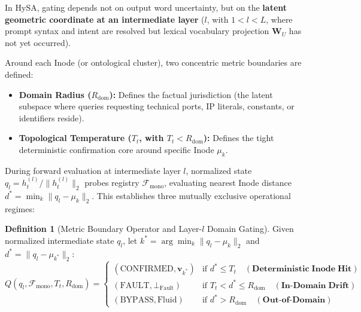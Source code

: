 \documentclass[11pt,a4paper]{article}
\theoremstyle{definition}
\newtheorem{definition}{Definition}
\begin{document}
In HySA, gating depends not on output word uncertainty, but on the \textbf{latent geometric coordinate at an intermediate layer} ($l$, with $1 < l < L$, where prompt syntax and intent are resolved but lexical vocabulary projection $\mathbf{W}_U$ has not yet occurred).

Around each Inode (or ontological cluster), two concentric metric boundaries are defined:
\begin{itemize}[leftmargin=*, itemsep=2.0pt]
    \item \textbf{Domain Radius ($R_{\mathrm{dom}}$):} Defines the factual jurisdiction (the latent subspace where queries requesting technical ports, IP literals, constants, or identifiers reside).
    \item \textbf{Topological Temperature ($T_t$, with $T_t < R_{\mathrm{dom}}$):} Defines the tight deterministic confirmation core around specific Inode $\mu_k$.
\end{itemize}

During forward evaluation at intermediate layer $l$, normalized state $q_l = h_t^{(l)} / \|h_t^{(l)}\|_2$ probes registry $\mathcal{F}_{\mathrm{mono}}$, evaluating nearest Inode distance $d^* = \min_k \|q_l - \mu_k\|_2$. This establishes three mutually exclusive operational regimes:

\begin{definition}[Metric Boundary Operator and Layer-$l$ Domain Gating]
Given normalized intermediate state $q_l$, let $k^* = \arg\min_k \|q_l - \mu_k\|_2$ and $d^* = \|q_l - \mu_{k^*}\|_2$:
{\small
\begin{equation}
    Q(q_l, \mathcal{F}_{\mathrm{mono}}, T_t, R_{\mathrm{dom}}) = 
    \begin{cases} 
      (\mathrm{CONFIRMED}, \mathbf{v}_{k^*}) & \text{if } d^* \le T_t \quad (\mathbf{Deterministic\;Inode\;Hit}) \\ 
      (\mathrm{FAULT}, \bot_{\mathrm{Fault}}) & \text{if } T_t < d^* \le R_{\mathrm{dom}} \quad (\mathbf{In\text{-}Domain\;Drift}) \\
      (\mathrm{BYPASS}, \mathrm{Fluid}) & \text{if } d^* > R_{\mathrm{dom}} \quad (\mathbf{Out\text{-}of\text{-}Domain})
    \end{cases}
\end{equation}
}
\end{definition}
\end{document}
